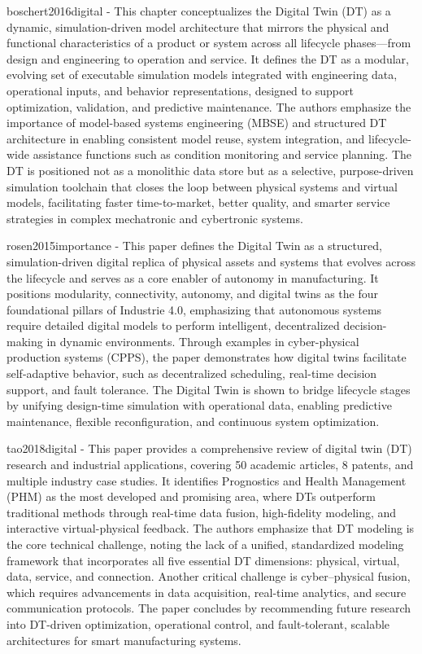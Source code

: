 boschert2016digital - This chapter conceptualizes the Digital Twin (DT) as a dynamic, simulation-driven model architecture that mirrors the physical and functional characteristics of a product or system across all lifecycle phases—from design and engineering to operation and service. It defines the DT as a modular, evolving set of executable simulation models integrated with engineering data, operational inputs, and behavior representations, designed to support optimization, validation, and predictive maintenance. The authors emphasize the importance of model-based systems engineering (MBSE) and structured DT architecture in enabling consistent model reuse, system integration, and lifecycle-wide assistance functions such as condition monitoring and service planning. The DT is positioned not as a monolithic data store but as a selective, purpose-driven simulation toolchain that closes the loop between physical systems and virtual models, facilitating faster time-to-market, better quality, and smarter service strategies in complex mechatronic and cybertronic systems.

rosen2015importance - This paper defines the Digital Twin as a structured, simulation-driven digital replica of physical assets and systems that evolves across the lifecycle and serves as a core enabler of autonomy in manufacturing. It positions modularity, connectivity, autonomy, and digital twins as the four foundational pillars of Industrie 4.0, emphasizing that autonomous systems require detailed digital models to perform intelligent, decentralized decision-making in dynamic environments. Through examples in cyber-physical production systems (CPPS), the paper demonstrates how digital twins facilitate self-adaptive behavior, such as decentralized scheduling, real-time decision support, and fault tolerance. The Digital Twin is shown to bridge lifecycle stages by unifying design-time simulation with operational data, enabling predictive maintenance, flexible reconfiguration, and continuous system optimization.


tao2018digital - This paper provides a comprehensive review of digital twin (DT) research and industrial applications, covering 50 academic articles, 8 patents, and multiple industry case studies. It identifies Prognostics and Health Management (PHM) as the most developed and promising area, where DTs outperform traditional methods through real-time data fusion, high-fidelity modeling, and interactive virtual-physical feedback. The authors emphasize that DT modeling is the core technical challenge, noting the lack of a unified, standardized modeling framework that incorporates all five essential DT dimensions: physical, virtual, data, service, and connection. Another critical challenge is cyber–physical fusion, which requires advancements in data acquisition, real-time analytics, and secure communication protocols. The paper concludes by recommending future research into DT-driven optimization, operational control, and fault-tolerant, scalable architectures for smart manufacturing systems.

